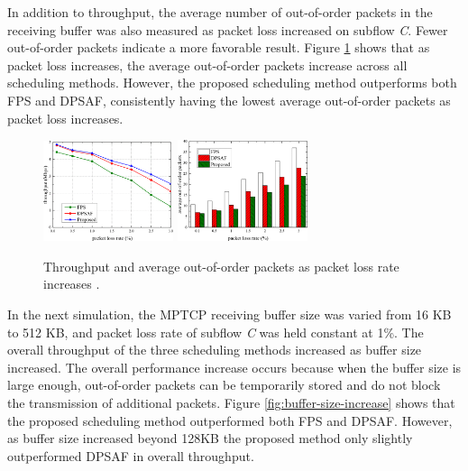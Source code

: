 \documentclass[sigplan,screen,nonacm]{acmart}
\begin{document}
In addition to throughput, the average number of out-of-order packets in the receiving buffer was also measured as packet loss increased on subflow \emph{C}. Fewer out-of-order packets indicate a more favorable result. Figure \ref{fig:plr-increased} shows that as packet loss increases, the average out-of-order packets increase across all scheduling methods. However, the proposed scheduling method outperforms both FPS and DPSAF, consistently having the lowest average out-of-order packets as packet loss increases.
\begin{figure}
\centering
\includegraphics[width=1.5in]{mptcp_paper/assets/packet-loss.png}
\includegraphics[width=1.5in]{mptcp_paper/assets/out-of-order-plr.png}
\caption{Throughput and average out-of-order packets as packet loss rate increases \cite{NewMethod:2018}.} 
\label{fig:plr-increased}
\end{figure}

In the next simulation, the MPTCP receiving buffer size was varied from 16 KB to 512 KB, and packet loss rate of subflow \emph{C} was held constant at 1\%. The overall throughput of the three scheduling methods increased as buffer size increased. The overall performance increase occurs because when the buffer size is large enough, out-of-order packets can be temporarily stored and do not block the transmission of additional packets. Figure \ref{fig:buffer-size-increase} shows that the proposed scheduling method outperformed both FPS and DPSAF. However, as buffer size increased beyond 128KB the proposed method only slightly outperformed DPSAF in overall throughput.
\end{document}
